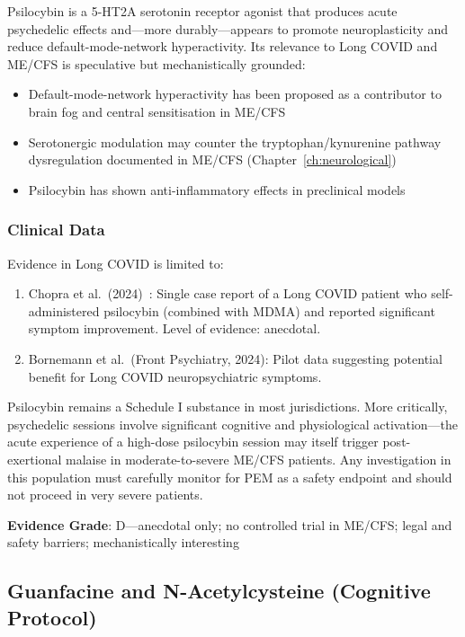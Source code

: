 Psilocybin is a 5-HT2A serotonin receptor agonist that produces acute psychedelic effects and---more durably---appears to promote neuroplasticity and reduce default-mode-network hyperactivity. Its relevance to Long COVID and ME/CFS is speculative but mechanistically grounded:
\begin{itemize}
    \item Default-mode-network hyperactivity has been proposed as a contributor to brain fog and central sensitisation in ME/CFS
    \item Serotonergic modulation may counter the tryptophan/kynurenine pathway dysregulation documented in ME/CFS (Chapter~\ref{ch:neurological})
    \item Psilocybin has shown anti-inflammatory effects in preclinical models
\end{itemize}

\subsubsection{Clinical Data}

Evidence in Long COVID is limited to:
\begin{enumerate}
    \item Chopra et al.\ (2024)~\cite{Chopra2024psilocybin}: Single case report of a Long COVID patient who self-administered psilocybin (combined with MDMA) and reported significant symptom improvement. Level of evidence: anecdotal.
    \item Bornemann et al.\ (Front Psychiatry, 2024): Pilot data suggesting potential benefit for Long COVID neuropsychiatric symptoms.
\end{enumerate}

\begin{warning}
Psilocybin remains a Schedule I substance in most jurisdictions. More critically, psychedelic sessions involve significant cognitive and physiological activation---the acute experience of a high-dose psilocybin session may itself trigger post-exertional malaise in moderate-to-severe ME/CFS patients. Any investigation in this population must carefully monitor for PEM as a safety endpoint and should not proceed in very severe patients.
\end{warning}

\textbf{Evidence Grade}: D---anecdotal only; no controlled trial in ME/CFS; legal and safety barriers; mechanistically interesting

\subsection{Guanfacine and N-Acetylcysteine (Cognitive Protocol)}
\label{subsec:guanfacine-nac}

